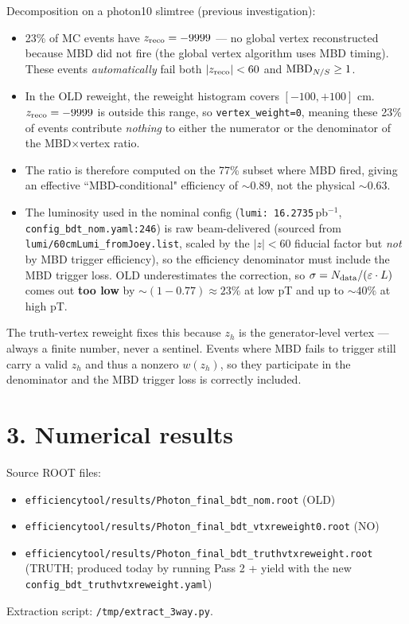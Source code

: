 \documentclass[11pt,a4paper]{article}
\begin{document}
Decomposition on a photon10 slimtree (previous investigation):
\begin{itemize}
\item 23\% of MC events have $z_{\rm reco}=-9999$ — no global vertex reconstructed because MBD did not fire (the global vertex algorithm uses MBD timing). These events \emph{automatically} fail both $|z_{\rm reco}|<60$ and ${\rm MBD}_{N/S}\ge1$.
\item In the OLD reweight, the reweight histogram covers $[-100,+100]$ cm. $z_{\rm reco}=-9999$ is outside this range, so \texttt{vertex\_weight=0}, meaning these 23\% of events contribute \emph{nothing} to either the numerator or the denominator of the MBD$\times$vertex ratio.
\item The ratio is therefore computed on the 77\% subset where MBD fired, giving an effective ``MBD-conditional" efficiency of $\sim 0.89$, not the physical $\sim 0.63$.
\item The luminosity used in the nominal config (\texttt{lumi: 16.2735}\,pb$^{-1}$, \texttt{config\_bdt\_nom.yaml:246}) is raw beam-delivered (sourced from \texttt{lumi/60cmLumi\_fromJoey.list}, scaled by the $|z|<60$ fiducial factor but \emph{not} by MBD trigger efficiency), so the efficiency denominator must include the MBD trigger loss. OLD underestimates the correction, so $\sigma = N_{\rm data}/(\varepsilon\cdot L)$ comes out \textbf{too low} by $\sim (1-0.77)\approx 23\%$ at low pT and up to $\sim 40\%$ at high pT.
\end{itemize}

The truth-vertex reweight fixes this because $z_h$ is the generator-level vertex — always a finite number, never a sentinel. Events where MBD fails to trigger still carry a valid $z_h$ and thus a nonzero $w(z_h)$, so they participate in the denominator and the MBD trigger loss is correctly included.

\section*{3. Numerical results}

Source ROOT files:
\begin{itemize}
\item \texttt{efficiencytool/results/Photon\_final\_bdt\_nom.root} (OLD)
\item \texttt{efficiencytool/results/Photon\_final\_bdt\_vtxreweight0.root} (NO)
\item \texttt{efficiencytool/results/Photon\_final\_bdt\_truthvtxreweight.root} (TRUTH; produced today by running Pass 2 + yield with the new \texttt{config\_bdt\_truthvtxreweight.yaml})
\end{itemize}
Extraction script: \texttt{/tmp/extract\_3way.py}.
\end{document}
